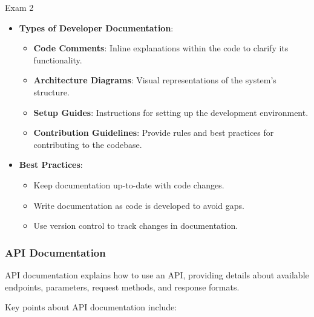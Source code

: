 \begin{examnotes}{Exam 2}
\begin{highlight}
        \begin{itemize}
            \item \textbf{Types of Developer Documentation}:
                \begin{itemize}
                    \item \textbf{Code Comments}: Inline explanations within the code to clarify its functionality.
                    \item \textbf{Architecture Diagrams}: Visual representations of the system's structure.
                    \item \textbf{Setup Guides}: Instructions for setting up the development environment.
                    \item \textbf{Contribution Guidelines}: Provide rules and best practices for contributing to the codebase.
                \end{itemize}
            \item \textbf{Best Practices}:
                \begin{itemize}
                    \item Keep documentation up-to-date with code changes.
                    \item Write documentation as code is developed to avoid gaps.
                    \item Use version control to track changes in documentation.
                \end{itemize}
        \end{itemize}
    \end{highlight}
    
    \subsubsection*{API Documentation}
    
    API documentation explains how to use an API, providing details about available endpoints, parameters, request methods, and response formats.
    
    \begin{highlight}
        Key points about API documentation include:
        

\end{highlight}
\end{examnotes}

